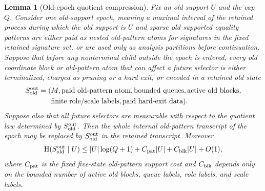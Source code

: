 \documentclass[11pt]{article}
\newtheorem{lemma}[theorem]{Lemma}
\theoremstyle{remark}
\newcommand{\HH}{\mathrm H}
\newcommand{\old}{\mathrm{old}}
\begin{document}
\begin{lemma}[Old-epoch quotient compression]\label{lem:old-epoch-quotient}
Fix an old support $U$ and the cap $Q$.  Consider one old-support epoch, meaning a maximal interval of the retained process during which the old support is $U$ and sparse old-supported equality patterns are either paid as nested old-pattern atoms for signatures in the fixed retained signature set, or are used only as analysis partitions before continuation.  Suppose that before any nonterminal child outside the epoch is entered, every old coordinate block or old-pattern atom that can affect a future selector is either terminalized, charged as pruning or a hard exit, or encoded in a retained old state
\[
\begin{aligned}
        S_{\old}^{\rm out}
        =(&M,\hbox{paid old-pattern atom},\hbox{bounded queues},
          \hbox{active old blocks},\\
          &\hbox{finite role/scale labels},\hbox{paid hard-exit data}).
\end{aligned}
\]
Suppose also that all future selectors are measurable with respect to the quotient law determined by $S_{\old}^{\rm out}$.  Then the whole internal old-pattern transcript of the epoch may be replaced by $S_{\old}^{\rm out}$ in the retained transcript.  Moreover
\[
        \HH(S_{\old}^{\rm out}\mid U)
        \le |U|\log(Q+1)+C_{\rm pat}|U|+C_{\rm blk}|U|+O(1),
\]
where $C_{\rm pat}$ is the fixed five-state old-pattern support cost and $C_{\rm blk}$ depends only on the bounded number of active old blocks, queue labels, role labels, and scale labels.
\end{lemma}
\end{document}
